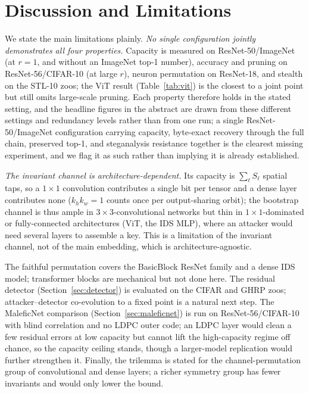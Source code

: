 \documentclass[10pt,journal]{IEEEtran}
\theoremstyle{remark}
\begin{document}
\section{Discussion and Limitations}\label{sec:disc}
We state the main limitations plainly. \emph{No single configuration jointly demonstrates
all four properties.} Capacity is measured on ResNet-50/ImageNet (at $r{=}1$, and without an
ImageNet top-1 number), accuracy and pruning on ResNet-56/CIFAR-10 (at large $r$), neuron
permutation on ResNet-18, and stealth on the STL-10 zoos; the ViT result
(Table~\ref{tab:vit}) is the closest to a joint point but still omits large-scale pruning.
Each property therefore holds in the stated setting, and the headline figures in the abstract
are drawn from these different settings and redundancy levels rather than from one run; a
single ResNet-50/ImageNet configuration carrying capacity, byte-exact recovery through the full
chain, preserved top-1, and steganalysis resistance together is the clearest missing experiment,
and we flag it as such rather than implying it is already established.

\emph{The invariant channel is architecture-dependent.} Its capacity is $\sum_\ell S_\ell$
spatial taps, so a $1\times1$ convolution contributes a single bit per tensor and a dense layer
contributes none ($k_h k_w=1$ counts once per output-sharing orbit); the bootstrap channel is
thus ample in $3\times3$-convolutional networks but thin in $1\times1$-dominated or
fully-connected architectures (ViT, the IDS MLP), where an attacker would need several layers to
assemble a key. This is a limitation of the invariant channel, not of the main embedding, which
is architecture-agnostic.

The faithful permutation covers the BasicBlock ResNet family and a dense IDS model;
transformer blocks are mechanical but not done here. The residual detector
(Section~\ref{sec:detector}) is evaluated on the CIFAR and GHRP zoos; attacker--detector
co-evolution to a fixed point is a natural next step. The MaleficNet comparison
(Section~\ref{sec:maleficnet}) is run on ResNet-56/CIFAR-10 with blind correlation and no LDPC
outer code; an LDPC layer would clean a few residual errors at low capacity but cannot lift the
high-capacity regime off chance, so the capacity ceiling stands, though a larger-model
replication would further strengthen it. Finally, the trilemma is stated for the
channel-permutation group of convolutional and dense layers; a richer symmetry group has fewer
invariants and would only lower the bound.
\end{document}
